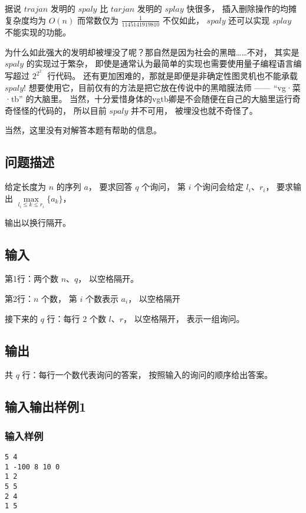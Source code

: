\documentclass[UTF8]{ctexart}
\begin{document}
据说 $trajan$ 发明的 $spaly$ 比 $tarjan$ 发明的 $splay$ 快很多， 插入删除操作的均摊复杂度均为 $O(n)$ 而常数仅为 $\frac{1}{1145141919810}$ 不仅如此， $spaly$ 还可以实现 $splay$ 不能实现的功能。

为什么如此强大的发明却被埋没了呢？那自然是因为社会的黑暗……不对， 其实是 $spaly$ 的实现过于繁杂， 即使是通常认为最简单的实现也需要使用量子编程语言编写超过 $2^{2^{2^{\cdots}}}$ 行代码。 还有更加困难的，那就是即便是非确定性图灵机也不能承载 $spaly$! 想要使用它，目前仅有的方法是把它放在传说中的黑暗膜法师 —— “vg·菜·tb” 的大脑里。 当然，十分爱惜身体的vgtb卿是不会随便在自己的大脑里运行奇奇怪怪的代码的， 所以目前 $spaly$ 并不可用， 被埋没也就不奇怪了。

当然，这里没有对解答本题有帮助的信息。

\subsection{问题描述}

给定长度为 $n$ 的序列 $a$， 要求回答 $q$ 个询问， 第 $i$ 个询问会给定 $l_i、r_i$， 要求输出 $\max\limits_{l_i\le k \le r_i} \lbrace a_k \rbrace$， 

输出以换行隔开。

\subsection{输入}

第1行：两个数 $n$、$q$， 以空格隔开。

第2行：$n$ 个数， 第 $i$ 个数表示 $a_i$， 以空格隔开

接下来的 $q$ 行：每行 $2$ 个数 $l$、$r$， 以空格隔开， 表示一组询问。

\subsection{输出}

共 $q$ 行：每行一个数代表询问的答案， 按照输入的询问的顺序给出答案。

\subsection{输入输出样例1}

\subsubsection{输入样例}

\begin{lstlisting}
5 4
1 -100 8 10 0
1 2
5 5
2 4
1 5
\end{lstlisting}
\end{document}
